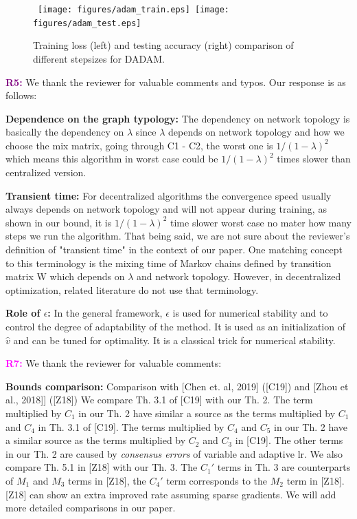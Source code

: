 \documentclass{article}
\begin{document}
\begin{figure}[H]
    \begin{center}
\mbox{
	\texttt{[image: figures/adam\_train.eps]}
	\texttt{[image: figures/adam\_test.eps]}
	}
    \end{center}
	\caption{Training loss (left) and testing accuracy (right) comparison of different stepsizes for DADAM.}
	\label{fig: stepsize}
\end{figure}


\vspace{0.01in}

\textbf{\textcolor{purple}{R5:}} We thank the reviewer for valuable comments and typos. Our response is as follows:\vspace{-5pt}

\textbf{Dependence on the graph typology:} 
The dependency on network topology is basically the dependency on $\lambda$ since $\lambda$ depends on network topology and how we choose the mix matrix, going through C1 - C2, the worst one is $1/(1- \lambda)^2$ which means this algorithm in worst case could be $1/(1- \lambda)^2$ times slower than centralized version.


\textbf{Transient time:}  For decentralized algorithms the convergence speed usually always depends on network topology and will not appear during training, as shown in our bound, it is $1/(1- \lambda)^2$ time slower worst case no mater how many steps we run the algorithm.  
That being said, we are not sure about the reviewer's definition of "transient time" in the context of our paper.
 One matching concept to this terminology is the mixing time of Markov chains defined by transition matrix W which depends on $\lambda$ and network topology. However, in decentralized optimization, related literature do not use that terminology.

\textbf{Role of $\epsilon$:} 
In the general framework, $\epsilon$ is used for numerical stability and to control the degree of adaptability of the method. It is used as an initialization of $\hat{v}$ and can be tuned for optimality. It is a classical trick for numerical stability.

\vspace{0.01in}

\textbf{\textcolor{magenta}{R7:}} We thank the reviewer for valuable comments:\vspace{-5pt}

\textbf{Bounds comparison:} 
Comparison with [Chen et. al, 2019] ([C19]) and [Zhou et al., 2018]] ([Z18])
We compare Th. 3.1 of [C19] with our Th. 2. 
The term multiplied by $C_1$ in our Th. 2 have similar a source as the terms multiplied by $C_1$ and $C_4$ in Th. 3.1 of [C19]. 
The terms multiplied by $C_4$ and $C_5$ in our Th. 2 have a similar source as the terms multiplied by $C_2$ and $C_3$ in [C19]. 
The other terms in our Th. 2 are caused by \emph{consensus errors} of variable and adaptive lr. We also compare Th. 5.1 in [Z18] with our Th. 3. The $C_1'$ terms in Th. 3 are counterparts of $M_1$ and $M_3$ terms in [Z18], the $C_4'$ term corresponds to the $M_2$ term in [Z18]. 
[Z18] can show an extra improved rate assuming sparse gradients. 
We will add  more detailed comparisons in our paper. 
\end{document}
